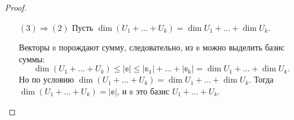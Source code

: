 \begin{proof}
\begin{itemize}
	\item[$(3) \Rightarrow (2)$] Пусть $\dim(U_1 + \ldots + U_k) = \dim{U_1} + \ldots + \dim{U_k}.$
	
	Векторы $\mathbb{e}$ порождают сумму, следовательно, из $\mathbb{e}$ можно выделить базис суммы:
	$$
	\dim(U_1 + \ldots + U_k) \leqslant |\mathbb{e}| \leqslant |\mathbb{e_1}|+ \ldots + |\mathbb{e_k}| = \dim{U_1} + \ldots + \dim{U_k}.
	$$
	Но по условию $\dim(U_1 + \ldots + U_k) = \dim{U_1} + \ldots + \dim{U_k}$. Тогда $\dim(U_1 + \ldots + U_k) = |\mathbb{e}|$, и $\mathbb{e}$ это базис $U_1 + \ldots + U_k$.
 \end{itemize}
 \end{proof}
 
